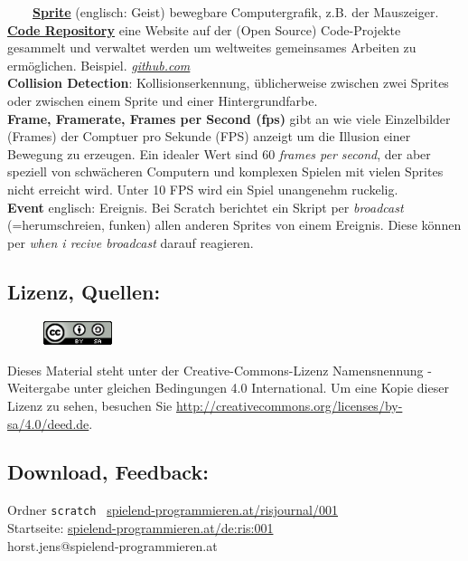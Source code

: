 ~~~~\href{https://de.wikipedia.org/wiki/Sprite_(Computergrafik)}{\textbf{Sprite}} (englisch: Geist) bewegbare Computergrafik, z.B. der Mauszeiger.\\

\href{https://en.wikipedia.org/wiki/Source_code_repository}{\textbf{Code Repository}} eine Website auf der (Open Source) Code-Projekte gesammelt und verwaltet werden um weltweites gemeinsames Arbeiten zu ermöglichen. Beispiel. \href{http://github.com}{\textit{github.com}}\\

\textbf{Collision Detection}: Kollisionserkennung, üblicherweise zwischen zwei Sprites oder zwischen einem Sprite und einer Hintergrundfarbe. \\

\textbf{Frame, Framerate, Frames per Second (fps)} gibt an wie viele Einzelbilder (Frames) der Comptuer pro Sekunde (FPS) anzeigt um die Illusion einer Bewegung zu erzeugen. Ein idealer Wert sind 60 \textit{frames per second}, der aber speziell von schwächeren Computern und komplexen Spielen mit vielen Sprites nicht erreicht wird. Unter 10 FPS wird ein Spiel unangenehm ruckelig. \\

\textbf{Event} englisch: Ereignis. Bei Scratch berichtet ein Skript per \textit{broadcast} (=herumschreien, funken) allen anderen Sprites von einem Ereignis. Diese können per \textit{when i recive broadcast} darauf reagieren. \\


\subsection*{Lizenz, Quellen:}
\begin{figure}
\includegraphics[width=2cm]{powdertoytutorial/ccbysa88x31.png}
\end{figure}
Dieses Material steht unter der Creative-Commons-Lizenz Namensnennung - Weitergabe unter gleichen Bedingungen 4.0 International. Um eine Kopie dieser Lizenz zu sehen, besuchen Sie \url{http://creativecommons.org/licenses/by-sa/4.0/deed.de}.

\subsection*{Download, Feedback:}
\footnotesize{
Ordner \texttt{scratch} \Mundus\ \href{http://spielend-programmieren.at/risjournal/001}{spielend-programmieren.at/risjournal/001}\\
Startseite: \href{http://spielend-programmieren.at/de:ris:001:start}{spielend-programmieren.at/de:ris:001}\\ 
\Letter\:  horst.jens@spielend-programmieren.at \\}
\normalsize{}

